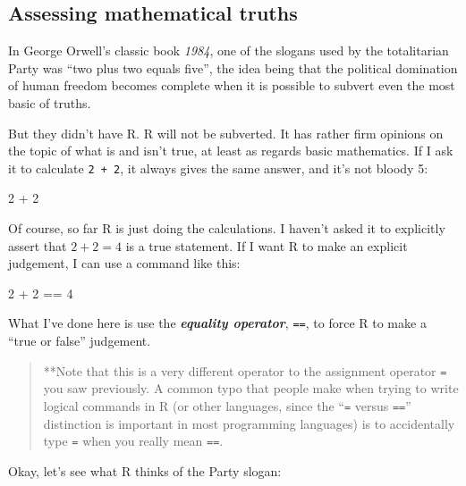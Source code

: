 \documentclass[
]{book}
\newenvironment{Shaded}{\begin{snugshade}}{\end{snugshade}}
\newcommand{\DecValTok}[1]{\textcolor[rgb]{0.00,0.00,0.81}{#1}}
\newcommand{\SpecialCharTok}[1]{\textcolor[rgb]{0.00,0.00,0.00}{#1}}
\begin{document}
\hypertarget{assessing-mathematical-truths}{%
\subsection{Assessing mathematical truths}\label{assessing-mathematical-truths}}

In George Orwell's classic book \emph{1984}, one of the slogans used by the totalitarian Party was ``two plus two equals five'', the idea being that the political domination of human freedom becomes complete when it is possible to subvert even the most basic of truths.

But they didn't have R. R will not be subverted. It has rather firm opinions on the topic of what is and isn't true, at least as regards basic mathematics. If I ask it to calculate \texttt{2\ +\ 2}, it always gives the same answer, and it's not bloody 5:

\begin{Shaded}
\begin{Highlighting}[]
\DecValTok{2} \SpecialCharTok{+} \DecValTok{2}
\end{Highlighting}
\end{Shaded}

Of course, so far R is just doing the calculations. I haven't asked it to explicitly assert that \(2+2 = 4\) is a true statement. If I want R to make an explicit judgement, I can use a command like this:

\begin{Shaded}
\begin{Highlighting}[]
\DecValTok{2} \SpecialCharTok{+} \DecValTok{2} \SpecialCharTok{==} \DecValTok{4}
\end{Highlighting}
\end{Shaded}

What I've done here is use the \textbf{\emph{equality operator}}, \texttt{==}, to force R to make a ``true or false'' judgement.

\begin{quote}
**Note that this is a very different operator to the assignment operator \texttt{=} you saw previously. A common typo that people make when trying to write logical commands in R (or other languages, since the ``\texttt{=} versus \texttt{==}'' distinction is important in most programming languages) is to accidentally type \texttt{=} when you really mean \texttt{==}.
\end{quote}

Okay, let's see what R thinks of the Party slogan:
\end{document}
